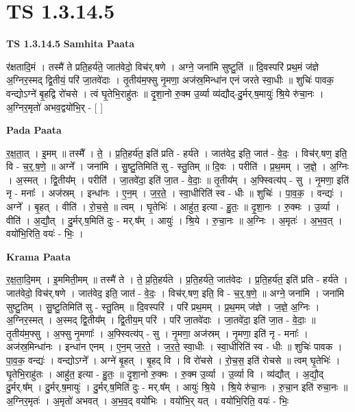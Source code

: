 \documentclass[17pt]{extarticle}
\begin{document}
\section{ TS 1.3.14.5 }

\textbf{TS 1.3.14.5 } \newline
\textbf{Samhita Paata} \newline

र॑क्षतादि॒मं । तस्मै॑ ते प्रति॒हर्य॑ते॒ जात॑वेदो॒ विच॑र्.षणे । अग्ने॒ जना॑मि सुष्टु॒तिं ॥ दि॒वस्परि॑ प्रथ॒मं ज॑ज्ञे अ॒ग्निर॒स्मद् द्वि॒तीयं॒ परि॑ जा॒तवे॑दाः । तृ॒तीय॑म॒फ्सु नृ॒मणा॒ अज॑स्र॒मिन्धा॑न एनं जरते स्वा॒धीः ॥ शुचिः॑ पावक॒ वन्द्योऽग्ने॑ बृ॒हद्वि रो॑चसे । त्वं घृ॒तेभि॒राहु॑तः ॥ दृ॒शा॒नो रु॒क्म उ॒र्व्या व्य॑द्यौद्-दु॒र्मर्.ष॒मायुः॑ श्रि॒ये रु॑चा॒नः । अ॒ग्निर॒मृतो॑ अभव॒द्वयो॑भि॒र् - [ ] \newline

\textbf{Pada Paata} \newline

र॒क्ष॒ता॒त् । इ॒मम् ॥ तस्मै᳚ । ते॒ । प्र॒ति॒हर्य॑त॒ इति॑ प्रति - हर्य॑ते । जात॑वेद॒ इति॒ जात॑ - वे॒दः॒ । विच॑र्.षण॒ इति॒ वि - च॒र्॒.ष॒णे॒ ॥ अग्ने᳚ । जना॑मि । सु॒ष्टु॒तिमिति॑ सु - स्तु॒तिम् ॥ दि॒वः । परीति॑ । प्र॒थ॒मम् । ज॒ज्ञे॒ । अ॒ग्निः । अ॒स्मत् । द्वि॒तीय᳚म् । परीति॑॑ । जा॒तवे॑दा॒ इति॑ जा॒त - वे॒दाः॒ ॥ तृ॒तीय᳚म् । अ॒फ्स्वित्य॑प् - सु । नृ॒मणा॒ इति॑ नृ - मनाः᳚ । अज॑स्रम् । इन्धा॑नः । ए॒न॒म् । ज॒र॒ते॒ । स्वा॒धीरिति॑ स्व - धीः ॥ शुचिः॑ । पा॒व॒क॒ । वन्द्यः॑ । अग्ने᳚ । बृ॒हत् । वीति॑ । रो॒च॒से॒ ॥ त्वम् । घृ॒तेभिः॑ । आहु॑त॒ इत्या - हु॒तः॒ ॥ दृ॒शा॒नः । रु॒क्मः । उ॒र्व्या । वीति॑ । अ॒द्यौ॒त् । दु॒र्मर्.ष॒मिति॑ दुः - मर्.ष᳚म् । आयुः॑ । श्रि॒ये । रु॒चा॒नः ॥ अ॒ग्निः । अ॒मृतः॑ । अ॒भ॒व॒त् । वयो॑भि॒रिति॒ वयः॑ - भिः॒ ।  \newline


\textbf{Krama Paata} \newline

र॒क्ष॒ता॒दि॒मम् । इ॒ममिती॒मम् ॥ तस्मै॑ ते । ते॒ प्र॒ति॒हर्य॑ते । प्र॒ति॒हर्य॑ते॒ जात॑वेदः । प्र॒ति॒हर्य॑त॒ इति॑ प्रति - हर्य॑ते । जात॑वेदो॒ विच॑र्.षणे । जात॑वेद॒ इति॒ जात॑ - वे॒दः॒ । विच॑र्.षण॒ इति॒ वि - च॒र्॒.ष॒णे॒ ॥ अग्ने॒ जना॑मि । जना॑मि सुष्टु॒तिम् । सु॒ष्टु॒तिमिति॑ सु - स्तु॒तिम् ॥ दि॒वस्परि॑ । परि॑ प्रथ॒मम् । प्र॒थ॒मम् ज॑ज्ञे । ज॒ज्ञे॒ अ॒ग्निः । अ॒ग्निर॒स्मत् । अ॒स्मद् द्वि॒तीय᳚म् । द्वि॒तीय॒म् परि॑ । परि॑ जा॒तवे॑दाः । जा॒तवे॑दा॒ इति॑ जा॒त - वे॒दाः॒ ॥ तृ॒तीय॑म॒फ्सु । अ॒फ्सु नृ॒मणाः᳚ । अ॒फ्स्वित्य॑प् - सु । नृ॒मणा॒ अज॑स्रम् । नृ॒मणा॒ इति॑ नृ - मनाः᳚ । अज॑स्र॒मिन्धा॑नः । इन्धा॑न एनम् । ए॒न॒म् ज॒र॒ते॒ । ज॒र॒ते॒ स्वा॒धीः । स्वा॒धीरिति॑ स्व - धीः ॥ शुचिः॑ पावक । पा॒व॒क॒ वन्द्यः॑ । वन्द्योऽग्ने᳚ । अग्ने॑ बृ॒हत् । बृ॒हद् वि । वि रो॑चसे । रो॒च॒स॒ इति॑ रोचसे ॥ त्वम् घृ॒तेभिः॑ । घृ॒तेभि॒राहु॑तः । आहु॑त॒ इत्या - हु॒तः॒ ॥ दृ॒शा॒नो रु॒क्मः । रु॒क्म उ॒र्व्या । उ॒र्व्या वि । व्य॑द्यौत् । अ॒द्यौ॒द् दु॒र्मर्.ष᳚म् । दु॒र्मर्.ष॒मायुः॑ । दु॒र्मर्.ष॒मिति॑ दुः - मर्.ष᳚म् । आयुः॑ श्रि॒ये । श्रि॒ये रु॑चा॒नः । रु॒चा॒न इति॑ रुचा॒नः ॥ 
अ॒ग्निर॒मृतः॑ । अ॒मृतो॑ अभवत् । अ॒भ॒व॒द् वयो॑भिः । वयो॑भि॒र् यत् । वयो॑भि॒रिति॒ वयः॑ - भिः॒ \newline
\end{document}
